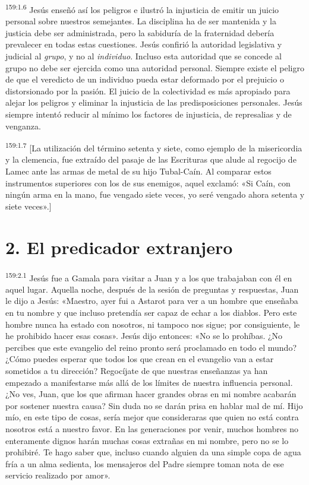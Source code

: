 \par 
\textsuperscript{159:1.6} Jesús enseñó así los peligros e ilustró la injusticia de emitir un juicio personal sobre nuestros semejantes. La disciplina ha de ser mantenida y la justicia debe ser administrada, pero la sabiduría de la fraternidad debería prevalecer en todas estas cuestiones. Jesús confirió la autoridad legislativa y judicial al \textit{grupo}, y no al \textit{individuo}. Incluso esta autoridad que se concede al grupo no debe ser ejercida como una autoridad personal. Siempre existe el peligro de que el veredicto de un individuo pueda estar deformado por el prejuicio o distorsionado por la pasión. El juicio de la colectividad es más apropiado para alejar los peligros y eliminar la injusticia de las predisposiciones personales. Jesús siempre intentó reducir al mínimo los factores de injusticia, de represalias y de venganza.

\par 
\textsuperscript{159:1.7} [La utilización del término setenta y siete, como ejemplo de la misericordia y la clemencia, fue extraído del pasaje de las Escrituras que alude al regocijo de Lamec ante las armas de metal de su hijo Tubal-Caín. Al comparar estos instrumentos superiores con los de sus enemigos, aquel exclamó: «Si Caín, con ningún arma en la mano, fue vengado siete veces, yo seré vengado ahora setenta y siete veces».]

\section*{2. El predicador extranjero}
\par 
\textsuperscript{159:2.1} Jesús fue a Gamala para visitar a Juan y a los que trabajaban con él en aquel lugar. Aquella noche, después de la sesión de preguntas y respuestas, Juan le dijo a Jesús: «Maestro, ayer fui a Astarot para ver a un hombre que enseñaba en tu nombre y que incluso pretendía ser capaz de echar a los diablos. Pero este hombre nunca ha estado con nosotros, ni tampoco nos sigue; por consiguiente, le he prohibido hacer esas cosas». Jesús dijo entonces: «No se lo prohíbas. ¿No percibes que este evangelio del reino pronto será proclamado en todo el mundo? ¿Cómo puedes esperar que todos los que crean en el evangelio van a estar sometidos a tu dirección? Regocíjate de que nuestras enseñanzas ya han empezado a manifestarse más allá de los límites de nuestra influencia personal. ¿No ves, Juan, que los que afirman hacer grandes obras en mi nombre acabarán por sostener nuestra causa? Sin duda no se darán prisa en hablar mal de mí. Hijo mío, en este tipo de cosas, sería mejor que consideraras que quien no está contra nosotros está a nuestro favor. En las generaciones por venir, muchos hombres no enteramente dignos harán muchas cosas extrañas en mi nombre, pero no se lo prohibiré. Te hago saber que, incluso cuando alguien da una simple copa de agua fría a un alma sedienta, los mensajeros del Padre siempre toman nota de ese servicio realizado por amor».

